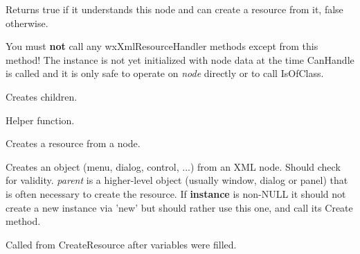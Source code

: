 Returns true if it understands this node and can create
a resource from it, false otherwise.


You must {\bf not} call any wxXmlResourceHandler methods except 
 from this method! The instance
is not yet initialized with node data at the time CanHandle is called and it is only
safe to operate on {\it node} directly or to call IsOfClass.

\label{wxxmlresourcehandlercreatechildren}


Creates children.

\label{wxxmlresourcehandlercreatechildrenprivately}


Helper function.

\label{wxxmlresourcehandlercreateresfromnode}


Creates a resource from a node.

\label{wxxmlresourcehandlercreateresource}


Creates an object (menu, dialog, control, ...) from an XML node.
Should check for validity. {\it parent} is a higher-level object (usually window, dialog or panel)
that is often necessary to create the resource.
If {\bf instance} is non-NULL it should not create a new instance via 'new' but
should rather use this one, and call its Create method.

\label{wxxmlresourcehandlerdocreateresource}


Called from CreateResource after variables
were filled.

